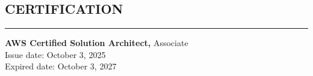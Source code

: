 \documentclass{article}
\begin{document}
\subsection*{CERTIFICATION}
\vspace{-0.1em}
\hrule
\vspace{0.4em}
{\bf AWS Certified Solution Architect, }Associate \\
Issue date: October 3, 2025 \\
Expired date: October 3, 2027
\end{document}
